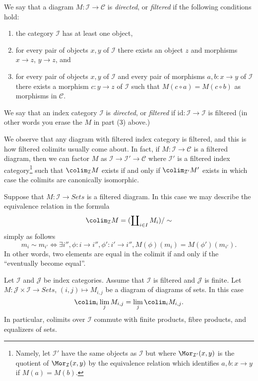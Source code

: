 \begin{definition}
\label{definition-directed}
We say that a diagram $M : \mathcal{I} \to \mathcal{C}$ is {\it directed},
or {\it filtered} if the following conditions hold:
\begin{enumerate}
\item the category $\mathcal{I}$ has at least one object,
\item for every pair of objects $x, y$ of $\mathcal{I}$
there exists an object $z$ and morphisms $x \to z$,
$y \to z$, and
\item for every pair of objects $x, y$ of $\mathcal{I}$
and every pair of morphisms $a, b : x \to y$ of $\mathcal{I}$
there exists a morphism $c : y \to z$ of $\mathcal{I}$
such that $M(c \circ a) = M(c \circ b)$ as morphisms in $\mathcal{C}$.
\end{enumerate}
We say that an index category $\mathcal{I}$ is {\it directed}, or
{\it filtered} if $\text{id} : \mathcal{I} \to \mathcal{I}$ is filtered
(in other words you erase the $M$ in part (3) above.)
\end{definition}

\noindent
We observe that any diagram with filtered index category is filtered,
and this is how filtered colimits usually come about. In fact, if
$M : \mathcal{I} \to \mathcal{C}$ is a filtered diagram, then we
can factor $M$ as $\mathcal{I} \to \mathcal{I}' \to \mathcal{C}$
where $\mathcal{I}'$ is a filtered index category\footnote{Namely, let
$\mathcal{I}'$ have the same objects as $\mathcal{I}$ but
where $\Mor_{\mathcal{I}'}(x, y)$ is the quotient of $\Mor_\mathcal{I}(x, y)$
by the equivalence relation which identifies
$a, b : x \to y$ if $M(a) = M(b)$.}
such that $\colim_\mathcal{I} M$ exists if and only if
$\colim_{\mathcal{I}'} M'$ exists in which case the colimits are
canonically isomorphic.

\medskip\noindent
Suppose that $M : \mathcal{I} \to \textit{Sets}$ is a filtered diagram. In
this case we may describe the equivalence relation in the formula
$$
\colim_\mathcal{I} M
=
(\coprod\nolimits_{i\in I} M_i)/\sim
$$
simply as follows
$$
m_i \sim m_{i'}
\Leftrightarrow
\exists i'', \phi : i \to i'', \phi': i' \to i'',
M(\phi)(m_i) = M(\phi')(m_{i'}).
$$
In other words, two elements are equal in the colimit if and only if
the ``eventually become equal''.

\begin{lemma}
\label{lemma-directed-commutes}
Let $\mathcal{I}$ and $\mathcal{J}$ be index categories.
Assume that $\mathcal{I}$ is filtered and $\mathcal{J}$ is finite.
Let $M : \mathcal{J} \times \mathcal{I} \to \textit{Sets}$,
$(i, j) \mapsto M_{i, j}$ be a diagram of diagrams of sets.
In this case
$$
\colim_i \lim_j M_{i, j}
=
\lim_j \colim_i M_{i, j}.
$$
In particular, colimits over $\mathcal{I}$ commute with finite products,
fibre products, and equalizers of sets.
\end{lemma}


